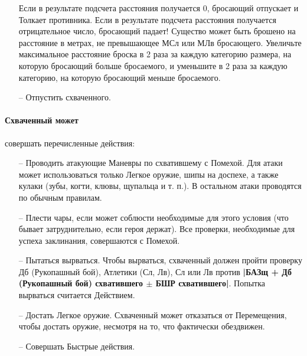 \begin{itemize}
\newline
Если в результате подсчета расстояния получается 0, бросающий отпускает и Толкает противника. Если в результате подсчета расстояния получается отрицательное число, бросающий падает! Существо может быть брошено на расстояние в метрах, не превышающее МСл или МЛв бросающего. Увеличьте максимальное расстояние броска в 2 раза за каждую категорию размера, на которую бросающий больше бросаемого, и уменьшите в 2 раза за каждую категорию, на которую бросающий меньше бросаемого.
\item[--] Отпустить схваченного.
\end{itemize}
\paragraph{Схваченный может} совершать перечисленные действия:
\begin{itemize}
\item[--] Проводить атакующие Маневры по схватившему с Помехой. Для атаки может использоваться только Легкое оружие, шипы на доспехе, а также кулаки (зубы, когти, клювы, щупальца и т. п.). В остальном атаки проводятся по обычным правилам.
\item[--] Плести чары, если может соблюсти необходимые для этого условия (что бывает затруднительно, если героя держат). Все проверки, необходимые для успеха заклинания, совершаются с Помехой.
\item[--] Пытаться вырваться. Чтобы вырваться, схваченный должен пройти проверку Дб (Рукопашный бой), Атлетики (Сл, Лв), Сл или Лв против \textbf{|БАЗщ + Дб (Рукопашный бой) схватившего $\pm$ БШР схватившего|}. Попытка вырваться считается Действием.
\item[--] Достать Легкое оружие. Схваченный может отказаться от Перемещения, чтобы достать оружие, несмотря на то, что фактически обездвижен.
\item[--] Совершать Быстрые действия.
\end{itemize}
